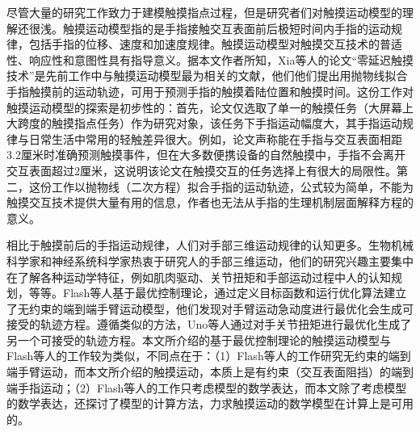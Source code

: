 尽管大量的研究工作致力于建模触摸指点过程\cite{ko2020modeling, bi2013ffitts, butzler2012bivariate, el2018evaluating, vetter2011fitts}，但是研究者们对触摸运动模型的理解还很浅。触摸运动模型指的是手指接触交互表面前后极短时间内手指的运动规律，包括手指的位移、速度和加速度规律。触摸运动模型对触摸交互技术的普适性、响应性和意图性具有指导意义。据本文作者所知，Xia等人的论文“零延迟触摸技术”\cite{xia2014zero}是先前工作中与触摸运动模型最为相关的文献，他们他们提出用抛物线拟合手指触摸前的运动轨迹，可用于预测手指的触摸着陆位置和触摸时间。这份工作对触摸运动模型的探索是初步性的：首先，论文仅选取了单一的触摸任务（大屏幕上大跨度的触摸指点任务）作为研究对象，该任务下手指运动幅度大，其手指运动规律与日常生活中常用的轻触差异很大。例如，论文声称能在手指与交互表面相距3.2厘米时准确预测触摸事件，但在大多数便携设备的自然触摸中，手指不会离开交互表面超过2厘米，这说明该论文在触摸交互的任务选择上有很大的局限性。第二，这份工作以抛物线（二次方程）拟合手指的运动轨迹，公式较为简单，不能为触摸交互技术提供大量有用的信息，作者也无法从手指的生理机制层面解释方程的意义。


相比于触摸前后的手指运动规律，人们对手部三维运动规律的认知更多。生物机械科学家\cite{uno1989formation}和神经系统科学家\cite{flash1985coordination,galloway2002general}热衷于研究人的手部三维运动，他们的研究兴趣主要集中在了解各种运动学特征，例如肌肉驱动、关节扭矩和手部运动过程中人的认知规划，等等。Flash等人基于最优控制理论，通过定义目标函数和运行优化算法建立了无约束的端到端手臂运动模型\cite{flash1985coordination}，他们发现对手臂运动急动度进行最优化会生成可接受的轨迹方程。遵循类似的方法，Uno等人通过对手关节扭矩进行最优化生成了另一个可接受的轨迹方程\cite{uno1989formation}。本文所介绍的基于最优控制理论的触摸运动模型与Flash等人的工作较为类似，不同点在于：（1）Flash等人的工作研究无约束的端到端手臂运动，而本文所介绍的触摸运动，本质上是有约束（交互表面阻挡）的端到端手指运动；（2）Flash等人的工作只考虑模型的数学表达，而本文除了考虑模型的数学表达，还探讨了模型的计算方法，力求触摸运动的数学模型在计算上是可用的。


